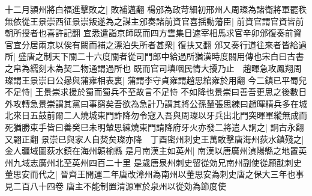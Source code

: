十二月潁州將白福進擊敗之|{
	敗補邁翻}
楊邠為政苛細初邢州人周璨為諸衛將軍罷秩無依從王景崇西征景崇叛遂為之謀主邠奏諸前資官喜揺動藩臣|{
	前資官謂官資皆前朝所授者也喜許記翻}
宜悉遣詣京師既而四方雲集日遮宰相馬求官辛卯邠復奏前資官宜分居兩京以俟有闕而補之漂泊失所者甚衆|{
	復扶又翻}
邠又奏行道往來者皆給過所|{
	盛唐之制天下關二十六度關者從司門郎中給過所猶漢時度關用傳也宋白曰古書之帛為繻刻木為契二物通謂過所也}
既而官司填咽民情大擾乃止　趙暉急攻鳳翔周璨謂王景崇曰公曏與蒲雍相表裏|{
	蒲謂李守貞雍謂趙思綰雍於用翻}
今二鎮已平蜀兒不足恃|{
	王景崇求援於蜀而蜀兵不至故言不足恃}
不如降也景崇曰善吾更思之後數日外攻轉急景崇謂其黨曰事窮矣吾欲為急計乃謂其將公孫輦張思練曰趙暉精兵多在城北來日五鼓前爾二人燒城東門詐降勿令寇入吾與周璨以牙兵出北門突暉軍縱無成而死猶勝束手皆曰善癸巳未明輦思練燒東門請降府牙火亦發二將遣人詗之|{
	詗古永翻又翾正翻}
景崇已與家人自焚矣璨亦降　丁酉密州刺史王萬敢擊唐海州荻水鎮殘之|{
	金人疆域圖荻水鎮在海州贑榆縣}
是月南漢主如英州|{
	南漢以唐廣州湞陽縣之地置英州九域志廣州北至英州四百二十里}
是歲唐泉州刺史留從効兄南州副使從願酖刺史董思安而代之|{
	晉齊王開運二年唐改漳州為南州以董思安為刺史唐之保大三年也事見二百八十四卷}
唐主不能制置清源軍於泉州以從効為節度使

